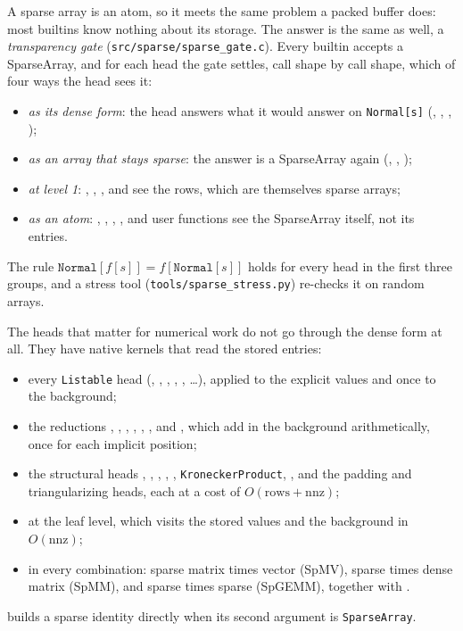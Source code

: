 A sparse array is an atom, so it meets the same problem a packed buffer does: most
builtins know nothing about its storage. The answer is the same as well, a
\emph{transparency gate}
(\texttt{src/sparse/sparse\_gate.c}). Every builtin accepts a SparseArray, and for
each head the gate settles, call shape by call shape, which of four ways the head sees
it:
\begin{itemize}
\item \emph{as its dense form}: the head answers what it would answer on
\texttt{Normal[s]} (, , , );
\item \emph{as an array that stays sparse}: the answer is a SparseArray again
(, , );
\item \emph{at level 1}: , , , and  see the rows,
which are themselves sparse arrays;
\item \emph{as an atom}: , , , , and user
functions see the SparseArray itself, not its entries.
\end{itemize}
The rule \(\mathtt{Normal}[f[s]] = f[\mathtt{Normal}[s]]\) holds for every head in the
first three groups, and a stress tool (\texttt{tools/sparse\_stress.py}) re-checks it
on random arrays.

The heads that matter for numerical work do not go through the dense form at all. They
have native kernels that read the stored entries:
\begin{itemize}
\item every \texttt{Listable} head (, , , ,
, \ldots), applied to the explicit values and once to the background;
\item the reductions , , , , , , and
, which add in the background arithmetically, once for each implicit
position;
\item the structural heads , , , ,
, \texttt{KroneckerProduct}, , and the padding and
triangularizing heads, each at a cost of \(O(\text{rows}+\text{nnz})\);
\item {} at the leaf level, which visits the stored values and the
background in \(O(\text{nnz})\);
\item {} in every combination: sparse matrix times vector (SpMV), sparse times
dense matrix (SpMM), and sparse times sparse (SpGEMM), together with .
\end{itemize}
 builds a sparse identity directly when its second argument is
\texttt{SparseArray}.

